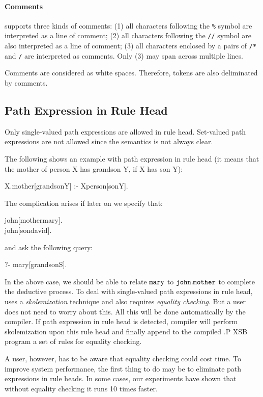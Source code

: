 \documentclass[11pt]{report}
\begin{document}
\paragraph{Comments}

\FLORA supports three kinds of comments: (1) all characters following the {\tt \%} symbol are
interpreted as a line of comment; (2) all characters following the {\tt //} symbol are also
interpreted as a line of comment; (3) all characters enclosed by a pairs of {\tt /*} and
{\tt */} are interpreted as comments. Only (3) may span across multiple lines.

Comments are considered as white spaces. Therefore, tokens are also deliminated by comments.

\subsection{Path Expression in Rule Head}

Only single-valued path expressions are allowed in rule head. Set-valued path expressions
are not allowed since the semantics is not always clear.

The following shows an example with path expression in rule head (it means that the mother
of person X has grandson Y, if X has son Y):
\begin{qrules}
X.mother[grandson{\mvd}Y] :- X{\isa}person[son{\mvd}Y].
\end{qrules}
The complication arises if later on we specify that:
\begin{qrules}
john[mother{\fd}mary]. \\
john[son{\mvd}david].
\end{qrules}
and ask the following query:
\begin{qrules}
?- mary[grandson{\mvd}S].
\end{qrules}

In the above case, we should be able to relate ${\tt mary}$ to ${\tt john.mother}$ to
complete the deductive process. To deal with single-valued path expressions in rule head,
\FLORA uses a \emph{skolemization} technique and also requires \emph{equality checking}. But a
user does not need to worry about this. All this will be done automatically by the \FLORA
compiler. If path expression in rule head is detected, \FLORA compiler will perform
skolemization upon this rule head and finally append to the compiled .P XSB program a set of
rules for equality checking.

A user, however, has to be aware that equality checking could cost time. To improve system
performance, the first thing to do may be to eliminate path expressions in rule heads. In some
cases, our experiments have shown that without equality checking it runs 10 times faster.
\end{document}

